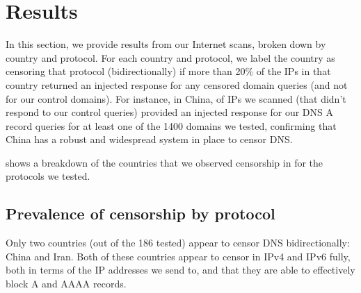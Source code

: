 \section{Results}
\PrevalenceGeneral
\label{sec:prevalence}

In this section, we provide results from our Internet scans, broken down by
country and protocol. For each country and protocol, we label the country as
censoring that protocol (bidirectionally) if more than 20\% of the IPs in that
country returned an injected response for any censored domain queries (and not
for our control domains). For instance, in China,  of IPs we
scanned (that didn't respond to our control queries) provided an injected
response for our DNS A record queries for at least one of the 1400 domains we
tested, confirming that China has a robust and widespread system in place to
censor DNS.

 shows a breakdown of the countries that we observed
censorship in for the protocols we tested.



\subsection{Prevalence of censorship by protocol}
\label{sec:prevalence:proto}



Only two countries (out of the 186 tested) appear to censor DNS bidirectionally:
China and Iran. Both of these countries appear to censor in IPv4 and IPv6 fully,
both in terms of the IP addresses we send to, and that they are able to
effectively block A and AAAA records.

